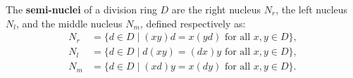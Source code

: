 The \textbf{semi-nuclei} of a division ring $D$ are the right nucleus $N_r$, the left nucleus $N_l$, and the middle nucleus $N_m$, defined respectively as:
\begin{align*}
N_r &= \{ d \in D \mid (xy)d = x(yd) \text{ for all } x, y \in D \}, \\
N_l &= \{ d \in D \mid d(xy) = (dx)y \text{ for all } x, y \in D \}, \\
N_m &= \{ d \in D \mid (xd)y = x(dy) \text{ for all } x, y \in D \}.
\end{align*}
